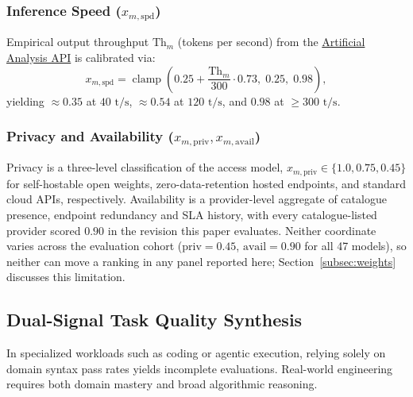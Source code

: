 \documentclass[pdflatex,sn-mathphys-num]{sn-jnl}
\theoremstyle{thmstyleone}
\theoremstyle{thmstylethree}
\begin{document}
\subsubsection{Inference Speed ($x_{m, \text{spd}}$)}
Empirical output throughput $\text{Th}_m$ (tokens per second) from the \href{https://artificialanalysis.ai/api-reference}{Artificial Analysis API} is calibrated via:
\begin{equation}\label{eq:speed_map}
x_{m, \text{spd}} = \operatorname{clamp}\left( 0.25 + \frac{\text{Th}_m}{300} \cdot 0.73, \; 0.25, \; 0.98 \right),
\end{equation}
yielding $\approx 0.35$ at $40\text{ t/s}$, $\approx 0.54$ at $120\text{ t/s}$, and $0.98$ at $\ge 300\text{ t/s}$.

\subsubsection{Privacy and Availability ($x_{m, \text{priv}}, x_{m, \text{avail}}$)}
Privacy is a three-level classification of the access model, $x_{m,\text{priv}} \in \{1.0,0.75,0.45\}$ for self-hostable open weights, zero-data-retention hosted endpoints, and standard cloud APIs, respectively. Availability is a provider-level aggregate of catalogue presence, endpoint redundancy and SLA history, with every catalogue-listed provider scored $0.90$ in the revision this paper evaluates. Neither coordinate varies across the evaluation cohort ($\text{priv} = 0.45$, $\text{avail} = 0.90$ for all 47 models), so neither can move a ranking in any panel reported here; Section~\ref{subsec:weights} discusses this limitation.

\subsection{Dual-Signal Task Quality Synthesis}\label{subsec:quality}

In specialized workloads such as coding or agentic execution, relying solely on domain syntax pass rates yields incomplete evaluations. Real-world engineering requires both domain mastery and broad algorithmic reasoning.
\end{document}
